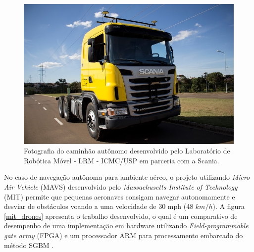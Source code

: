 \begin{figure}[]
 	\centering
 	\includegraphics[scale=0.40]{./Resources/caminhao_autonomo.jpg}
 	\caption{Fotografia do caminhão autônomo desenvolvido pelo Laboratório de Robótica Móvel - LRM - ICMC/USP em parceria com a Scania.}
 	\label{caminhao_autonomo}
\end{figure}


No caso de navegação autônoma para ambiente aéreo, o projeto utilizando \textit{Micro Air Vehicle} (MAVS) desenvolvido pelo \textit{Massachusetts Institute of Technology} (MIT) permite que pequenas aeronaves consigam navegar autonomamente e desviar de obstáculos voando a uma velocidade de 30 mph (48 $km/h$). A figura \ref{mit_drones} apresenta o trabalho desenvolvido, o qual é um comparativo de desempenho de uma implementação em hardware utilizando \textit{Field-programmable gate array} (FPGA) e um processador ARM para processamento embarcado do método SGBM \cite{BarryMIT}.


